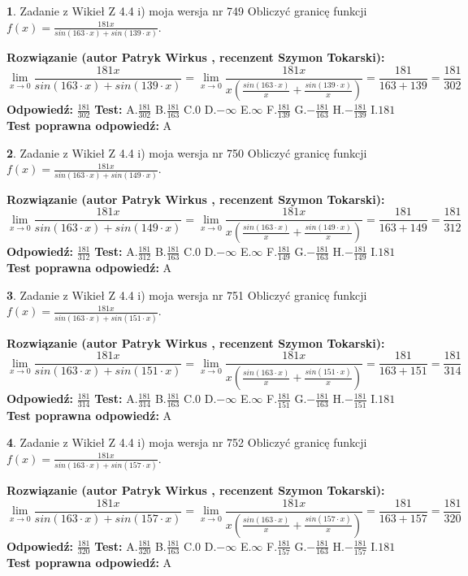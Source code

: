 \documentclass[12pt, a4paper]{article}
\theoremstyle{definition} %
\newtheorem{zad}{}
\newcommand{\zadStart}[1]{\begin{zad}#1\newline}
\newcommand{\zadStop}{\end{zad}}
\newcommand{\rozwStart}[2]{\noindent \textbf{Rozwiązanie (autor #1 , recenzent #2): }\newline}
\newcommand{\rozwStop}{\newline}
\newcommand{\odpStart}{\noindent \textbf{Odpowiedź:}\newline}
\newcommand{\odpStop}{\newline}
\newcommand{\testStart}{\noindent \textbf{Test:}\newline}
\newcommand{\testStop}{\newline}
\newcommand{\kluczStart}{\noindent \textbf{Test poprawna odpowiedź:}\newline}
\newcommand{\kluczStop}{\newline}
\begin{document}
\zadStart{Zadanie z Wikieł Z 4.4 i) moja wersja nr 749}
Obliczyć granicę funkcji $f(x)=\frac{181x}{sin(163\cdot x) +sin(139\cdot x)}$.
\zadStop
\rozwStart{Patryk Wirkus}{Szymon Tokarski}
$$\lim\limits_{x\to 0}\frac{181x}{sin(163\cdot x) +sin(139\cdot x)}=\lim\limits_{x\to 0}\frac{181x}{x(\frac{sin(163\cdot x)}{x}+\frac{sin(139\cdot x)}{x})}=\frac{181}{163+139} = \frac{181}{302}$$
\rozwStop
\odpStart
$\frac{181}{302}$
\odpStop
\testStart
A.$\frac{181}{302}$
B.$\frac{181}{163}$
C.$0$
D.$-\infty$
E.$\infty$
F.$\frac{181}{139}$
G.$-\frac{181}{163}$
H.$-\frac{181}{139}$
I.$181$
\testStop
\kluczStart
A
\kluczStop



\zadStart{Zadanie z Wikieł Z 4.4 i) moja wersja nr 750}
Obliczyć granicę funkcji $f(x)=\frac{181x}{sin(163\cdot x) +sin(149\cdot x)}$.
\zadStop
\rozwStart{Patryk Wirkus}{Szymon Tokarski}
$$\lim\limits_{x\to 0}\frac{181x}{sin(163\cdot x) +sin(149\cdot x)}=\lim\limits_{x\to 0}\frac{181x}{x(\frac{sin(163\cdot x)}{x}+\frac{sin(149\cdot x)}{x})}=\frac{181}{163+149} = \frac{181}{312}$$
\rozwStop
\odpStart
$\frac{181}{312}$
\odpStop
\testStart
A.$\frac{181}{312}$
B.$\frac{181}{163}$
C.$0$
D.$-\infty$
E.$\infty$
F.$\frac{181}{149}$
G.$-\frac{181}{163}$
H.$-\frac{181}{149}$
I.$181$
\testStop
\kluczStart
A
\kluczStop



\zadStart{Zadanie z Wikieł Z 4.4 i) moja wersja nr 751}
Obliczyć granicę funkcji $f(x)=\frac{181x}{sin(163\cdot x) +sin(151\cdot x)}$.
\zadStop
\rozwStart{Patryk Wirkus}{Szymon Tokarski}
$$\lim\limits_{x\to 0}\frac{181x}{sin(163\cdot x) +sin(151\cdot x)}=\lim\limits_{x\to 0}\frac{181x}{x(\frac{sin(163\cdot x)}{x}+\frac{sin(151\cdot x)}{x})}=\frac{181}{163+151} = \frac{181}{314}$$
\rozwStop
\odpStart
$\frac{181}{314}$
\odpStop
\testStart
A.$\frac{181}{314}$
B.$\frac{181}{163}$
C.$0$
D.$-\infty$
E.$\infty$
F.$\frac{181}{151}$
G.$-\frac{181}{163}$
H.$-\frac{181}{151}$
I.$181$
\testStop
\kluczStart
A
\kluczStop



\zadStart{Zadanie z Wikieł Z 4.4 i) moja wersja nr 752}
Obliczyć granicę funkcji $f(x)=\frac{181x}{sin(163\cdot x) +sin(157\cdot x)}$.
\zadStop
\rozwStart{Patryk Wirkus}{Szymon Tokarski}
$$\lim\limits_{x\to 0}\frac{181x}{sin(163\cdot x) +sin(157\cdot x)}=\lim\limits_{x\to 0}\frac{181x}{x(\frac{sin(163\cdot x)}{x}+\frac{sin(157\cdot x)}{x})}=\frac{181}{163+157} = \frac{181}{320}$$
\rozwStop
\odpStart
$\frac{181}{320}$
\odpStop
\testStart
A.$\frac{181}{320}$
B.$\frac{181}{163}$
C.$0$
D.$-\infty$
E.$\infty$
F.$\frac{181}{157}$
G.$-\frac{181}{163}$
H.$-\frac{181}{157}$
I.$181$
\testStop
\kluczStart
A
\kluczStop
\end{document}
